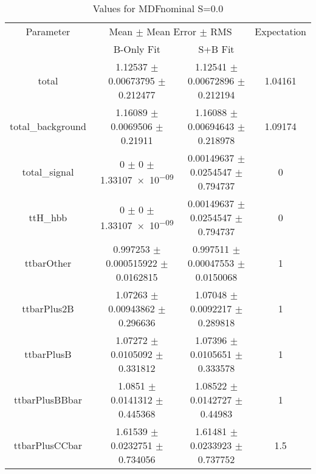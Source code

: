 \begin{table}
\centering
\caption{Values for MDFnominal S=0.0}
\begin{tabular}{cccc}
\toprule
Parameter & \multicolumn{2}{c}{Mean $\pm$ Mean Error $\pm$ RMS} & Expectation\\
 & B-Only Fit & S+B Fit & \\
\midrule
total & \num{1.12537} $\pm$ \num{0.00673795} $\pm$ \num{0.212477} & \num{1.12541} $\pm$ \num{0.00672896} $\pm$ \num{0.212194} & \num{1.04161}\\
total\_background & \num{1.16089} $\pm$ \num{0.0069506} $\pm$ \num{0.21911} & \num{1.16088} $\pm$ \num{0.00694643} $\pm$ \num{0.218978} & \num{1.09174}\\
total\_signal & \num{0} $\pm$ \num{0} $\pm$ \num{1.33107e-09} & \num{0.00149637} $\pm$ \num{0.0254547} $\pm$ \num{0.794737} & \num{0}\\
ttH\_hbb & \num{0} $\pm$ \num{0} $\pm$ \num{1.33107e-09} & \num{0.00149637} $\pm$ \num{0.0254547} $\pm$ \num{0.794737} & \num{0}\\
ttbarOther & \num{0.997253} $\pm$ \num{0.000515922} $\pm$ \num{0.0162815} & \num{0.997511} $\pm$ \num{0.00047553} $\pm$ \num{0.0150068} & \num{1}\\
ttbarPlus2B & \num{1.07263} $\pm$ \num{0.00943862} $\pm$ \num{0.296636} & \num{1.07048} $\pm$ \num{0.0092217} $\pm$ \num{0.289818} & \num{1}\\
ttbarPlusB & \num{1.07272} $\pm$ \num{0.0105092} $\pm$ \num{0.331812} & \num{1.07396} $\pm$ \num{0.0105651} $\pm$ \num{0.333578} & \num{1}\\
ttbarPlusBBbar & \num{1.0851} $\pm$ \num{0.0141312} $\pm$ \num{0.445368} & \num{1.08522} $\pm$ \num{0.0142727} $\pm$ \num{0.44983} & \num{1}\\
ttbarPlusCCbar & \num{1.61539} $\pm$ \num{0.0232751} $\pm$ \num{0.734056} & \num{1.61481} $\pm$ \num{0.0233923} $\pm$ \num{0.737752} & \num{1.5}\\
\bottomrule
\end{tabular}
\end{table}